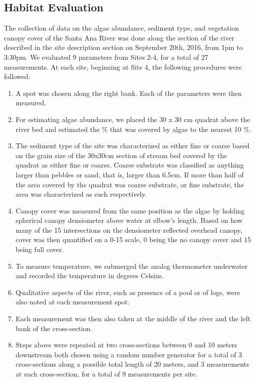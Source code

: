 \documentclass{article}\usepackage[]{graphicx}\usepackage[]{color}
\begin{document}
\subsection{Habitat Evaluation}

The collection of data on the algae abundance, sediment type, and vegetation canopy cover of the Santa Ana River was done along the section of the river described in the site description section on September 20th, 2016, from 1pm to 3:30pm. We evaluated 9 parameters from Sites 2-4, for a total of 27 measurements. At each site, beginning at Site 4, the following procedures were followed: 

\begin{enumerate}
\item A spot was chosen along the right bank. Each of the parameters were then measured.
\item For estimating algae abundance, we placed the 30  x 30 cm quadrat above the river bed and estimated the \% that was covered by algae to the nearest 10 \%.

\item The sediment type of the site was characterized as either fine or coarse based on the grain size of the 30x30cm section of stream bed covered by the quadrat as either fine or coarse. Coarse substrate was classified as anything larger than pebbles or sand, that is, larger than 6.5cm. If more than half of the area covered by the quadrat was coarse substrate, or fine substrate, the area was characterized as such respectively.

\item Canopy cover was measured from the same position as the algae by holding spherical canopy densiometer above water at elbow's length. Based on how many of the 15 intersections on the densiometer reflected overhead canopy, cover was then quantified on a 0-15 scale, 0 being the no canopy cover and 15 being full cover.

\item To measure temperature, we submerged the analog thermometer underwater and recorded the temperature in degrees Celsius.

\item Qualitative aspects of the river, such as presence of a pool or of logs, were also noted at each measurement spot.

\item Each measurement was then also taken at the middle of the river and the left bank of the cross-section. 

\item Steps above were repeated at two cross-sections between 0 and 10 meters downstream both chosen using a random number generator for a total of 3 cross-sections along a possible total length of 20 meters, and 3 measurements at each cross-section, for a total of 9 measurements per site. 
\end{enumerate}
\end{document}
